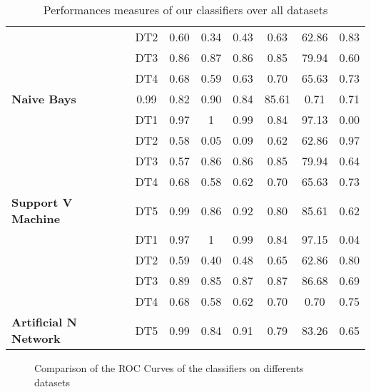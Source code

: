 \begin{table}[h]
{{\begin{tabular}{lccccccc}
 \cline{2-8}
  &DT2 & 0.60 &0.34   &0.43&0.63&62.86&0.83 \\
  \cline{2-8}
  &DT3 &0.86 &0.87 &0.86&0.85&79.94&0.60\\
  \cline{2-8}
  &DT4 &0.68 &0.59&0.63&0.70&65.63&0.73\\
  \cline{2-8}
\multirow{-4}{*}{ \textbf{Naive Bays}}&0.99 &0.82&0.90&0.84&85.61&0.71&0.71\\
\hline
\cline{2-8}
&DT1 &0.97 &1   &0.99 &0.84 &97.13&0.00 \\
\cline{2-8}
  &DT2 &0.58  &0.05   & 0.09&0.62&62.86&0.97\\
  \cline{2-8}
  &DT3 &0.57 & 0.86&0.86&0.85&79.94&0.64\\
  \cline{2-8}
 & DT4 & 0.68&0.58&0.62&0.70&65.63&0.73\\
 \cline{2-8}
 \multirow{-4}{*}{ \textbf{Support V Machine}}& DT5 &0.99 &0.86&0.92&0.80&85.61&0.62\\
 \hline
\cline{2-8}
&DT1 &0.97&1 &0.99   &0.84 &97.15&0.04  \\
\cline{2-8}
&  DT2 &0.59  &0.40   &0.48&0.65&62.86&0.80 \\
\cline{2-8}
 & DT3 &0.89 &0.85 &0.87&0.87&86.68&0.69\\
 \cline{2-8}
 & DT4 &0.68 &0.58&0.62&0.70&0.70&0.75\\
  \cline{2-8}
  \multirow{-4}{*}{ \textbf{ Artificial N Network}}&DT5 &0.99 &0.84&0.91&0.79&83.26&0.65\\ 
  \hline
\end{tabular}
}
}
\caption{Performances measures of our classifiers over all datasets}\label{raw_data1}
\end{table}
%
\begin{figure}[h]
\caption{Comparison of the ROC Curves of the classifiers on differents datasets}
\end{figure}
